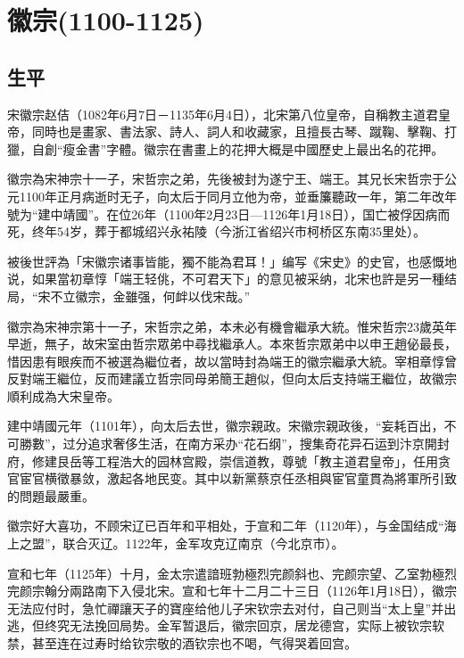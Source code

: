 
\section{徽宗\tiny(1100-1125)}

\subsection{生平}

宋徽宗赵佶（1082年6月7日－1135年6月4日），北宋第八位皇帝，自稱教主道君皇帝，同時也是畫家、書法家、詩人、詞人和收藏家，且擅長古琴、蹴鞠、擊鞠、打獵，自創“瘦金書”字體。徽宗在書畫上的花押大概是中國歷史上最出名的花押。

徽宗為宋神宗十一子，宋哲宗之弟，先後被封为遂宁王、端王。其兄长宋哲宗于公元1100年正月病逝时无子，向太后于同月立他为帝，並垂簾聽政一年，第二年改年號为“建中靖國”。在位26年（1100年2月23日—1126年1月18日），国亡被俘因病而死，终年54岁，葬于都城绍兴永祐陵（今浙江省绍兴市柯桥区东南35里处）。

被後世評為「宋徽宗诸事皆能，獨不能為君耳！」编写《宋史》的史官，也感慨地说，如果當初章惇「端王轻佻，不可君天下」的意见被采纳，北宋也許是另一種结局，“宋不立徽宗，金雖强，何衅以伐宋哉。”

徽宗為宋神宗第十一子，宋哲宗之弟，本未必有機會繼承大統。惟宋哲宗23歲英年早逝，無子，故宋室由哲宗眾弟中尋找繼承人。本來哲宗眾弟中以申王趙佖最長，惜因患有眼疾而不被選為繼位者，故以當時封為端王的徽宗繼承大統。宰相章惇曾反對端王繼位，反而建議立哲宗同母弟簡王趙似，但向太后支持端王繼位，故徽宗順利成為大宋皇帝。

建中靖國元年（1101年），向太后去世，徽宗親政。宋徽宗親政後，“妄耗百出，不可勝數”，过分追求奢侈生活，在南方采办“花石纲”，搜集奇花异石运到汴京開封府，修建艮岳等工程浩大的园林宫殿，崇信道教，尊號「教主道君皇帝」，任用贪官宦官横徵暴敛，激起各地民变。其中以新黨蔡京任丞相與宦官童貫為將軍所引致的問題最嚴重。

徽宗好大喜功，不顾宋辽已百年和平相处，于宣和二年（1120年），与金国结成“海上之盟”，联合灭辽。1122年，金军攻克辽南京（今北京市）。

宣和七年（1125年）十月，金太宗遣諳班勃極烈完颜斜也、完颜宗望、乙室勃極烈完颜宗翰分兩路南下入侵北宋。宣和七年十二月二十三日（1126年1月18日），徽宗无法应付时，急忙禪讓天子的寶座给他儿子宋钦宗去对付，自己则当“太上皇”并出逃，但终究无法挽回局势。金军暂退后，徽宗回京，居龙德宫，实际上被钦宗软禁，甚至连在过寿时给钦宗敬的酒钦宗也不喝，气得哭着回宫。

